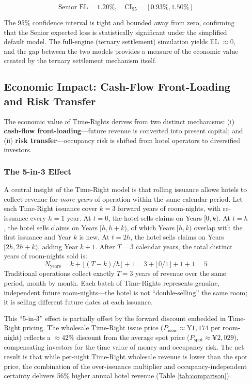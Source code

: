 \documentclass[12pt,a4paper]{article}
\begin{document}
\[
\text{Senior EL} = 1.20\%, \quad \text{CI}_{95} = [0.93\%, 1.50\%]
\]

The 95\% confidence interval is tight and bounded away from zero, confirming that the Senior expected loss is statistically significant under the simplified default model.
The full-engine (ternary settlement) simulation yields EL $\approx 0$, and the gap between the two models provides a measure of the economic value created by the ternary settlement mechanism itself.

\subsection{Economic Impact: Cash-Flow Front-Loading and Risk Transfer}

The economic value of Time-Rights derives from two distinct mechanisms: (i) \textbf{cash-flow front-loading}---future revenue is converted into present capital; and (ii) \textbf{risk transfer}---occupancy risk is shifted from hotel operators to diversified investors.

\subsubsection{The 5-in-3 Effect}

A central insight of the Time-Right model is that rolling issuance allows hotels to collect revenue for \emph{more years} of operation within the same calendar period.
Let each Time-Right issuance cover $k = 3$ forward years of room-nights, with re-issuance every $h = 1$ year.
At $t = 0$, the hotel sells claims on Years $[0, k)$.
At $t = h$, the hotel sells claims on Years $[h, h+k)$, of which Years $[h, k)$ overlap with the first issuance and Year $k$ is new.
At $t = 2h$, the hotel sells claims on Years $[2h, 2h+k)$, adding Year $k+1$.
After $T = 3$ calendar years, the total distinct years of room-nights sold is:
\begin{equation}
    N_{\text{years}} = k + \lfloor (T - k) / h \rfloor + 1 = 3 + \lfloor 0 / 1 \rfloor + 1 + 1 = 5
\end{equation}
Traditional operations collect exactly $T = 3$ years of revenue over the same period, month by month.
Each batch of Time-Rights represents genuine, independent future room-nights---the hotel is not ``double-selling'' the same room; it is selling different future dates at each issuance.

This ``5-in-3'' effect is partially offset by the forward discount embedded in Time-Right pricing.
The wholesale Time-Right issue price ($P_{\text{issue}} \approx \yen 1,174$ per room-night) reflects a $\approx$42\% discount from the average spot price ($P_{\text{spot}} \approx \yen 2,029$), compensating investors for the time value of money and occupancy risk.
The net result is that while per-night Time-Right wholesale revenue is lower than the spot price, the combination of the over-issuance multiplier and occupancy-independent certainty delivers 56\% higher annual hotel revenue (Table \ref{tab:comparison}).
\end{document}

